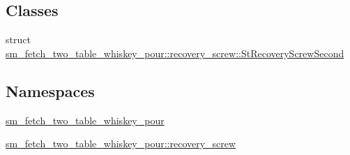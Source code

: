 \subsection*{Classes}
\begin{DoxyCompactItemize}
\item 
struct \hyperlink{structsm__fetch__two__table__whiskey__pour_1_1recovery__screw_1_1StRecoveryScrewSecond}{sm\+\_\+fetch\+\_\+two\+\_\+table\+\_\+whiskey\+\_\+pour\+::recovery\+\_\+screw\+::\+St\+Recovery\+Screw\+Second}
\end{DoxyCompactItemize}
\subsection*{Namespaces}
\begin{DoxyCompactItemize}
\item 
 \hyperlink{namespacesm__fetch__two__table__whiskey__pour}{sm\+\_\+fetch\+\_\+two\+\_\+table\+\_\+whiskey\+\_\+pour}
\item 
 \hyperlink{namespacesm__fetch__two__table__whiskey__pour_1_1recovery__screw}{sm\+\_\+fetch\+\_\+two\+\_\+table\+\_\+whiskey\+\_\+pour\+::recovery\+\_\+screw}
\end{DoxyCompactItemize}
